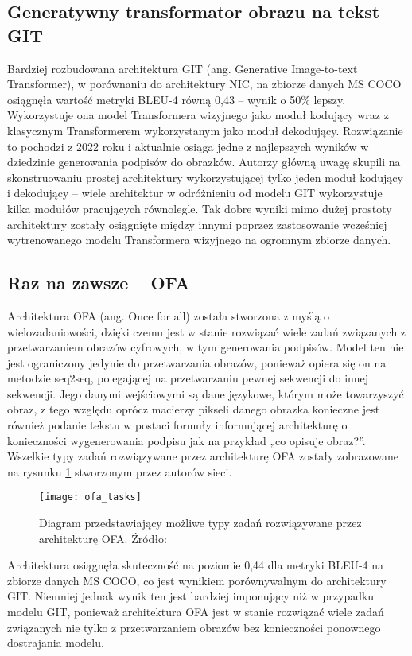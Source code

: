 \subsection{Generatywny transformator obrazu na tekst -- GIT}
Bardziej rozbudowana architektura GIT \cite{wang2022git} (ang. Generative Image-to-text Transformer), w porównaniu do architektury NIC, na zbiorze danych MS COCO osiągnęła wartość metryki BLEU-4 równą 0,43 -- wynik o 50\% lepszy. Wykorzystuje ona model Transformera wizyjnego jako moduł kodujący wraz z klasycznym Transformerem wykorzystanym jako moduł dekodujący. Rozwiązanie to pochodzi z 2022 roku i aktualnie osiąga jedne z najlepszych wyników w dziedzinie generowania podpisów do obrazków. Autorzy główną uwagę skupili na skonstruowaniu prostej architektury wykorzystującej tylko jeden moduł kodujący i dekodujący -- wiele architektur w odróżnieniu od modelu GIT wykorzystuje kilka modułów pracujących równolegle. Tak dobre wyniki mimo dużej prostoty architektury zostały osiągnięte między innymi poprzez zastosowanie wcześniej wytrenowanego modelu Transformera wizyjnego na ogromnym zbiorze danych.

\subsection{Raz na zawsze -- OFA}
Architektura OFA \cite{wang2022ofa} (ang. Once for all) została stworzona z myślą o wielozadaniowości, dzięki czemu jest w stanie rozwiązać wiele zadań związanych z przetwarzaniem obrazów cyfrowych, w tym generowania podpisów. Model ten nie jest ograniczony jedynie do przetwarzania obrazów, ponieważ opiera się on na metodzie seq2seq, polegającej na przetwarzaniu pewnej sekwencji do innej sekwencji. Jego danymi wejściowymi są dane językowe, którym może towarzyszyć obraz, z tego względu oprócz macierzy pikseli danego obrazka konieczne jest również podanie tekstu w postaci formuły informującej architekturę o konieczności wygenerowania podpisu jak na przykład „co opisuje obraz?”. Wszelkie typy zadań rozwiązywane przez architekturę OFA zostały zobrazowane na rysunku \ref{fig:ofa-tasks} stworzonym przez autorów sieci.
\begin{figure}[H]
  \centering
  \texttt{[image: ofa\_tasks]}
  \caption{Diagram przedstawiający możliwe typy zadań rozwiązywane przez architekturę OFA. Źródło: \cite{wang2022ofa}}
  \label{fig:ofa-tasks}
\end{figure}
\noindent Architektura osiągnęła skuteczność na poziomie 0,44 dla metryki BLEU-4 na zbiorze danych MS COCO, co jest wynikiem porównywalnym do architektury GIT. Niemniej jednak wynik ten jest bardziej imponujący niż w przypadku modelu GIT, ponieważ architektura OFA jest w stanie rozwiązać wiele zadań związanych nie tylko z przetwarzaniem obrazów bez konieczności ponownego dostrajania modelu.

